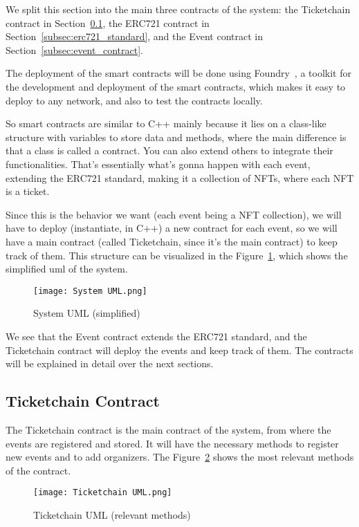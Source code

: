 We split this section into the main three contracts of the system: the
Ticketchain contract in Section~\ref{subsec:ticketchain_contract}, the ERC721
contract in Section~\ref{subsec:erc721_standard}, and the Event contract in
Section~\ref{subsec:event_contract}.

The deployment of the smart contracts will be done using
Foundry~\cite{foundry}, a toolkit for the development and deployment of the
smart contracts, which makes it easy to deploy to any network, and also to test
the contracts locally.

So smart contracts are similar to C++ mainly because it lies on a class-like
structure with variables to store data and methods, where the main difference
is that a class is called a contract. You can also extend others to integrate
their functionalities. That's essentially what's gonna happen with each event,
extending the ERC721 standard, making it a collection of NFTs, where each NFT
is a ticket.

Since this is the behavior we want (each event being a NFT collection), we will
have to deploy (instantiate, in C++) a new contract for each event, so we will
have a main contract (called Ticketchain, since it's the main contract) to keep
track of them. This structure can be visualized in the
Figure~\ref{fig:system_uml}, which shows the simplified \gls{uml} of the
system.

\begin{figure}[H]
	\texttt{[image: System UML.png]}
	\centering
	\caption{System UML (simplified)}\label{fig:system_uml}
\end{figure}

We see that the Event contract extends the ERC721 standard, and the Ticketchain
contract will deploy the events and keep track of them. The contracts will be
explained in detail over the next sections.

\subsection{Ticketchain Contract}\label{subsec:ticketchain_contract}

The Ticketchain contract is the main contract of the system, from where the
events are registered and stored. It will have the necessary methods to
register new events and to add organizers. The Figure~\ref{fig:ticketchain_uml}
shows the most relevant methods of the contract.

\begin{figure}[H]
	\texttt{[image: Ticketchain UML.png]}
	\centering
	\caption{Ticketchain UML (relevant methods)}\label{fig:ticketchain_uml}
\end{figure}

